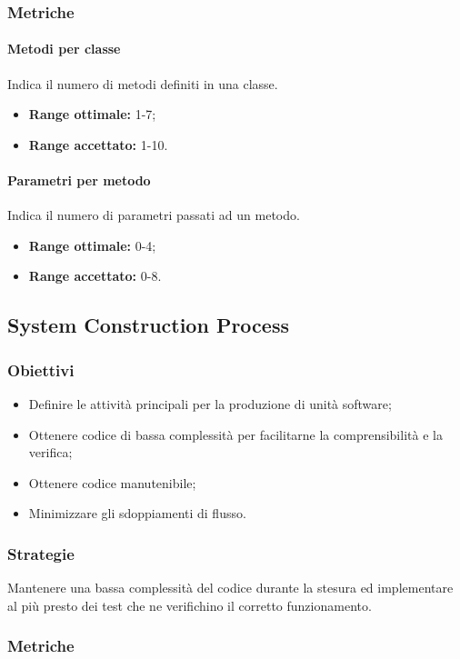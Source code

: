 		\subsubsection{Metriche}
			\paragraph{Metodi per classe} \Spazio
			Indica il numero di metodi definiti in una classe.
			\begin{itemize}
				\item \textbf{Range ottimale:} 1-7; 
				\item \textbf{Range accettato:} 1-10.
			\end{itemize}
			\paragraph{Parametri per metodo} \Spazio
			Indica il numero di parametri passati ad un metodo.
			\begin{itemize}
				\item \textbf{Range ottimale:} 0-4;
				\item \textbf{Range accettato:} 0-8.
			\end{itemize}
			
	\subsection{System Construction Process}
		\subsubsection{Obiettivi}
		\begin{itemize}
			\item Definire le attività principali per la produzione di unità software;
			\item Ottenere codice di bassa complessità per facilitarne la comprensibilità e la verifica;
			\item Ottenere codice manutenibile;
			\item Minimizzare gli sdoppiamenti di flusso.
		\end{itemize}
		\subsubsection{Strategie}
		Mantenere una bassa complessità del codice durante la stesura ed implementare al più presto dei test che ne verifichino il corretto funzionamento.
		\subsubsection{Metriche}
